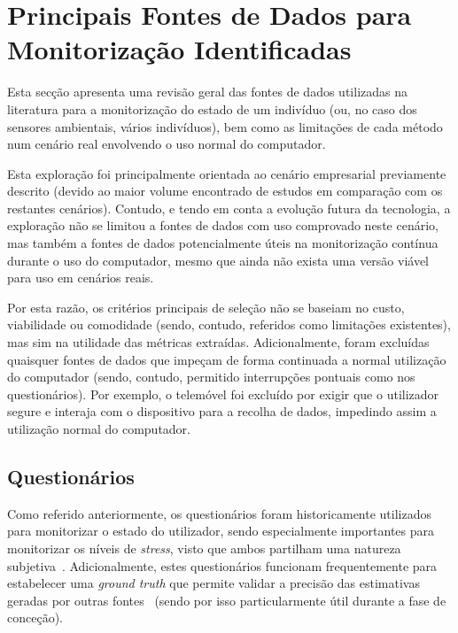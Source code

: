 \section{Principais Fontes de Dados para Monitorização Identificadas}
\label{sec:soa_data_sources}

Esta secção apresenta uma revisão geral das fontes de dados utilizadas na literatura para a monitorização do estado de um indivíduo (ou, no caso dos sensores ambientais, vários indivíduos), bem como as limitações de cada método num cenário real envolvendo o uso normal do computador.

Esta exploração foi principalmente orientada ao cenário empresarial previamente descrito (devido ao maior volume encontrado de estudos em comparação com os restantes cenários).
Contudo, e tendo em conta a evolução futura da tecnologia, a exploração não se limitou a fontes de dados com uso comprovado neste cenário, mas também a fontes de dados potencialmente úteis na monitorização contínua durante o uso do computador, mesmo que ainda não exista uma versão viável para uso em cenários reais.

Por esta razão, os critérios principais de seleção não se baseiam no custo, viabilidade ou comodidade (sendo, contudo, referidos como limitações existentes), mas sim na utilidade das métricas extraídas.
Adicionalmente, foram excluídas quaisquer fontes de dados que impeçam de forma continuada a normal utilização do computador (sendo, contudo, permitido interrupções pontuais como nos questionários).
Por exemplo, o telemóvel foi excluído por exigir que o utilizador segure e interaja com o dispositivo para a recolha de dados, impedindo assim a utilização normal do computador.



\subsection{Questionários}

Como referido anteriormente, os questionários foram historicamente utilizados para monitorizar o estado do utilizador, sendo especialmente importantes para monitorizar os níveis de \textit{stress}, visto que ambos partilham uma natureza subjetiva~\cite{Kafkov2024}.
Adicionalmente, estes questionários funcionam frequentemente para estabelecer uma \textit{ground truth} que permite validar a precisão das estimativas geradas por outras fontes~\cite{Kallio2025} (sendo por isso particularmente útil durante a fase de conceção).

